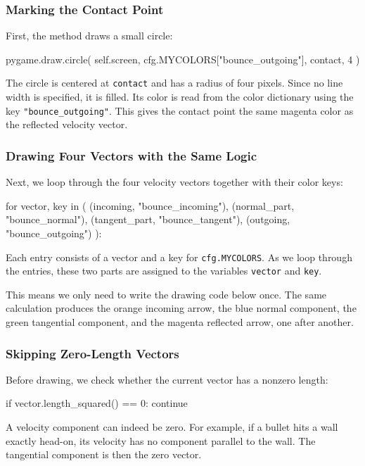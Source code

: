 \subsubsection*{Marking the Contact Point}

First, the method draws a small circle:
\begin{codebox}
pygame.draw.circle(
    self.screen,
    cfg.MYCOLORS["bounce_outgoing"],
    contact,
    4
)
\end{codebox}

The circle is centered at \texttt{contact} and has a radius of four pixels. Since no line width is specified, it is filled. Its color is read from the color dictionary using the key \texttt{"bounce\_out\-going"}. This gives the contact point the same magenta color as the reflected velocity vector.

\subsubsection*{Drawing Four Vectors with the Same Logic}

Next, we loop through the four velocity vectors together with their color keys:
\begin{codebox}
for vector, key in (
    (incoming, "bounce_incoming"),
    (normal_part, "bounce_normal"),
    (tangent_part, "bounce_tangent"),
    (outgoing, "bounce_outgoing")
):
\end{codebox}

Each entry consists of a vector and a key for \texttt{cfg.MYCOLORS}.
As we loop through the entries, these two parts are assigned to the variables \texttt{vector} and \texttt{key}.

This means we only need to write the drawing code below once. The same calculation produces the orange incoming arrow, the blue normal component, the green tangential component, and the magenta reflected arrow, one after another.

\subsubsection*{Skipping Zero-Length Vectors}

Before drawing, we check whether the current vector has a nonzero length:
\begin{codebox}
if vector.length_squared() == 0:
    continue
\end{codebox}

A velocity component can indeed be zero. For example, if a bullet hits a wall exactly head-on, its velocity has no component parallel to the wall. The tangential component is then the zero vector.

